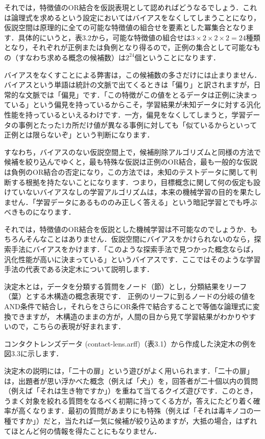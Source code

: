 それでは，特徴値のOR結合を仮説表現として認めればどうなるでしょう．これは論理式を求めるという設定においてはバイアスをなくしてしまうことになり，仮説空間は原理的に全ての可能な特徴値の組合せを要素とした冪集合となります．具体的にいうと，表3.2から，可能な特徴値の組合せは$3 \times 2 \times 2 \times 2 = 24$種類となり，それぞれが正例または負例となり得るので，正例の集合として可能なもの（すなわち求める概念の候補数）は$2^{24}$個ということになります．

バイアスをなくすことによる弊害は，この候補数の多さだけには止まりません．バイアスという単語は統計の文脈で出てくるときは「偏り」と訳されますが，日常的な文脈では「偏見」です．「この特徴がこの値をとるデータは正例に決まっている」という偏見を持っているからこそ，学習結果が未知データに対する汎化性能を持っているといえるわけです．一方，偏見をなくしてしまうと，学習データの事例とたった1カ所だけ値が異なる事例に対しても「似ているからといって正例とは限らないぞ」という判断になります．

すなわち，バイアスのない仮説空間上で，候補削除アルゴリズムと同様の方法で候補を絞り込んでゆくと，最も特殊な仮説は正例のOR結合，最も一般的な仮説は負例のOR結合の否定になり，この方法では，未知のテストデータに関して判断する根拠を持たないことになります．つまり，目標概念に関して何の仮定も設けていないバイアスなしの学習アルゴリズムは，本来の機械学習の目的を果たしません．「学習データにあるもののみ正しく答える」という暗記学習とでも呼ぶべきものになります．


それでは，特徴値のOR結合を仮説とした機械学習は不可能なのでしょうか．もちろんそんなことはありません．仮説空間にバイアスをかけられないのなら，探索手法にバイアスをかけます．「このような探索手法で見つかった概念ならば，汎化性能が高いに決まっている」というバイアスです．ここではそのような学習手法の代表である決定木について説明します．

決定木とは，データを分類する質問をノード（節）とし，分類結果をリーフ（葉）とする木構造の概念表現です．
正例のリーフに到るノードの分岐の値をAND条件で結合し，それらをさらにOR条件で結合することで等価な論理式に変換できますが，
木構造のままの方が，人間の目から見て学習結果がわかりやすいので，こちらの表現が好まれます．

コンタクトレンズデータ (contact-lens.arff)（表3.1）から作成した決定木の例を図3.3に示します．


決定木の説明には，「二十の扉」という遊びがよく用いられます．「二十の扉」は，出題者が思い浮かべた概念（例えば「犬」）を，回答者が二十個以内の質問（例えば「それは生き物ですか」）を重ねて当てるクイズ遊びです．このとき，うまく対象を絞れる質問をなるべく初期に持ってくる方が，答えにたどり着く確率が高くなります．最初の質問があまりにも特殊（例えば「それは毒キノコの一種ですか」）だと，当たれば一気に候補が絞り込めますが，大抵の場合，はずれてほとんど何の情報を得たことにもなりません．


